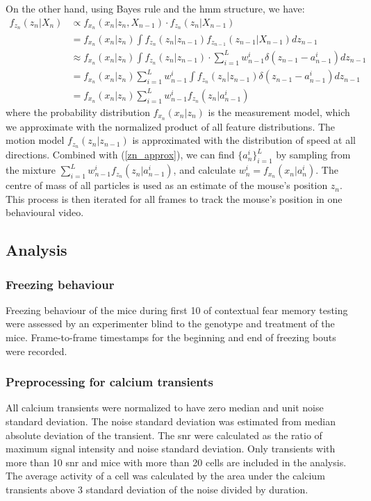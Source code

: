 On the other hand, using Bayes rule and the \gls{hmm} structure, we have:
\begin{align*}
    f_{z_n}(z_n|X_n) &\propto f_{x_n}(x_n|z_n, X_{n-1}) \cdot f_{z_n}(z_n|X_{n-1}) \\
                     &= f_{x_n}(x_n|z_n) \int f_{z_n}(z_n|z_{n-1})f_{z_{n-1}}(z_{n-1}|X_{n-1})dz_{n-1}  \\
                     &\approx f_{x_n}(x_n|z_n) \int f_{z_n}(z_n|z_{n-1})\cdot \sum_{i=1}^Lw_{n-1}^i\delta(z_{n-1}-a_{n-1}^i)dz_{n-1} \\
                     &= f_{x_n}(x_n|z_n)  \sum_{i=1}^Lw_{n-1}^i \int f_{z_n}(z_n|z_{n-1})\delta(z_{n-1} - a_{n-1}^i)dz_{n-1} \\
                     &= f_{x_n}(x_n|z_n) \sum_{i=1}^Lw_{n-1}^if_{z_n}(z_n|a_{n-1}^i) 
\end{align*}
where the probability distribution $f_{x_n}(x_n|z_n)$ is the measurement model, which we approximate with the normalized product of all feature distributions. The motion model $f_{z_n}(z_n|z_{n-1})$ is approximated with the distribution of speed at all directions. Combined with (\ref{zn_approx}), we can find $\{a_n^i\}_{i=1}^L$ by sampling from the mixture $\sum_{i=1}^Lw_{n-1}^if_{z_n}(z_n|a_{n-1}^i)$, and calculate $w_n^i = f_{x_n}(x_n|a_n^i)$. The centre of mass of all particles is used as an estimate of the mouse's position $z_n$. This process is then iterated for all frames to track the mouse's position in one behavioural video.

\subsection{Analysis}

\subsubsection{Freezing behaviour}
Freezing behaviour of the mice during first \SI{10}{\min} of contextual fear memory testing were assessed by an experimenter blind to the genotype and treatment of the mice. Frame-to-frame timestamps for the beginning and end of freezing bouts were recorded.

\subsubsection{Preprocessing for calcium transients}

All calcium transients were normalized to have zero median and unit noise standard deviation. The noise standard deviation was estimated from median absolute deviation of the transient. The \gls{snr} were calculated as the ratio of maximum signal intensity and noise standard deviation. Only transients with more than 10 \gls{snr} and mice with more than 20 cells are included in the analysis. The average activity of a cell was calculated by the area under the calcium transients above 3 standard deviation of the noise divided by duration.

